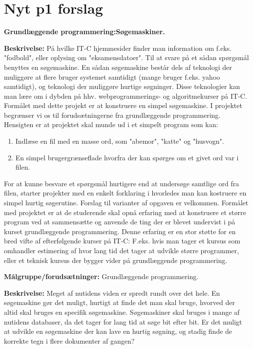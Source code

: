\chapter{Nyt p1 forslag}
{\Huge\textbf{Grundlæggende programmering:\newline Søgemaskiner.}}\newline

\textbf{Beskrivelse:}\newline
På hvilke IT-C hjemmesider finder man information om f.eks. "fodbold", eller oplysing om "eksamensdatoer". Til at svare på et sådan spørgsmål benyttes en søgemaskine. En sådan søgemaskine består dels af teknologi der muliggøre at flere bruger systemet samtidigt (mange bruger f.eks. yahoo samtidigt), og teknologi der muliggøre hurtige søgninger. Disse teknologier kan man lære om i dybden på hhv. webprogrammerings- og algoritmekurser på IT-C. Formålet med dette projekt er at konstruere en simpel søgemaskine. I projektet begrænser vi os til forudsætningerne fra grundlæggende programmering. Hensigten er at projektet skal munde ud i et simpelt program som kan:

\begin{enumerate}
\item Indlæse en fil med en masse ord, som "abemor", "katte" og "husvogn".\newline
\item En simpel brugergrænseflade hvorfra der kan spørges om et givet ord var i filen.
\end{enumerate}

For at kunne besvare et spørgsmål hurtigere end at undersøge samtlige ord fra filen, starter projekter med en enkelt forklaring i hvorledes man kan kostruere en simpel hurtig søgerutine.
Forslag til varianter af opgaven er velkommen. Formålet med projektet er at de studerende skal opnå erfaring med at konstruere et større program ved at sammensætte og anvende de ting der er blevet undervist i på kurset grundlæggende programmering. Denne erfaring er en stor støtte for en bred vifte af efterfølgende kurser på IT-C: F.eks. hvis man tager et kursus som omhandler estimering af hvor lang tid det tager at udvikle større programmer, eller et teknisk kursus der bygger vider på grundlæggende programmering.

{\Large\textbf{Målgruppe/forudsætninger:}}\newline
Grundlæggende programmering. 

\textbf{Beskrivelse:}\newline
Meget af nutidens viden er spredt rundt over det hele. En søgemaskine gør det muligt, hurtigt at finde det man skal bruge, hvorved der altid skal bruges en specifik søgemaskine.
Søgemaskiner skal bruges i mange af nutidens databaser, da det tager for lang tid at søge bit efter bit. Er det muligt at udvikle en søgemaskine der kan lave en hurtig søgning, og stadig finde de korrekte tegn i flere dokumenter af gangen?

